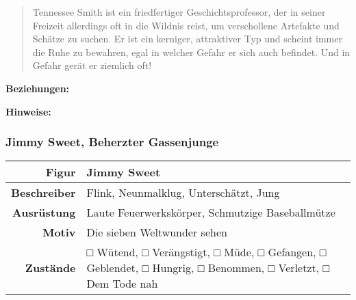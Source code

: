 \documentclass[]{article}
\begin{document}
\begin{quote}
Tennessee Smith ist ein friedfertiger Geschichtsprofessor, der in seiner
Freizeit allerdings oft in die Wildnis reist, um verschollene Artefakte
und Schätze zu suchen. Er ist ein kerniger, attraktiver Typ und scheint
immer die Ruhe zu bewahren, egal in welcher Gefahr er sich auch
befindet. Und in Gefahr gerät er ziemlich oft!
\end{quote}

\textbf{Beziehungen:}

\textbf{Hinweise:}

\subsubsection{Jimmy Sweet, Beherzter
Gassenjunge}\label{jimmy-sweet-beherzter-gassenjunge}

\begin{longtable}[]{@{}rl@{}}
\toprule
\begin{minipage}[b]{0.14\columnwidth}\raggedleft\strut
Figur
\strut\end{minipage} &
\begin{minipage}[b]{0.80\columnwidth}\raggedright\strut
Jimmy Sweet
\strut\end{minipage}\tabularnewline
\midrule
\endhead
\begin{minipage}[t]{0.14\columnwidth}\raggedleft\strut
\textbf{Beschreiber}
\strut\end{minipage} &
\begin{minipage}[t]{0.80\columnwidth}\raggedright\strut
Flink, Neunmalklug, Unterschätzt, Jung
\strut\end{minipage}\tabularnewline
\begin{minipage}[t]{0.14\columnwidth}\raggedleft\strut
\textbf{Ausrüstung}
\strut\end{minipage} &
\begin{minipage}[t]{0.80\columnwidth}\raggedright\strut
Laute Feuerwerkskörper, Schmutzige Baseballmütze
\strut\end{minipage}\tabularnewline
\begin{minipage}[t]{0.14\columnwidth}\raggedleft\strut
\textbf{Motiv}
\strut\end{minipage} &
\begin{minipage}[t]{0.80\columnwidth}\raggedright\strut
Die sieben Weltwunder sehen
\strut\end{minipage}\tabularnewline
\begin{minipage}[t]{0.14\columnwidth}\raggedleft\strut
\textbf{Zustände}
\strut\end{minipage} &
\begin{minipage}[t]{0.80\columnwidth}\raggedright\strut
□ Wütend, □ Verängstigt, □ Müde, □ Gefangen, □ Geblendet, □ Hungrig, □
Benommen, □ Verletzt, □ Dem Tode nah
\strut\end{minipage}\tabularnewline
\bottomrule
\end{longtable}
\end{document}
